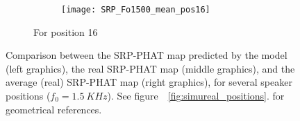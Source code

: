 \begin{figure}
\begin{subfigure}[t]{0.47\textwidth}
\begin{minipage}[t]{\textwidth}
\begin{subfigure}[t]{0.3\textwidth}
        \label{fig:SRP_pos16}
      \end{subfigure}
      \begin{subfigure}[t]{0.3\textwidth}
        \texttt{[image: SRP\_Fo1500\_mean\_pos16]}
        \label{fig:SRP_Fo1500_mean_pos16}
      \end{subfigure}
      \vspace{\verticalSpacingSRPMaps}
      \caption{\centering For position 16}
      \vspace{0.25cm}
    \end{minipage}
  \end{subfigure}
  \caption{Comparison between the SRP-PHAT map predicted by the model
    (left graphics),
    the real SRP-PHAT map (middle graphics), and the average (real)
    SRP-PHAT map (right graphics), for
    several speaker positions ($f_0=1.5~KHz$). See
    figure~~\ref{fig:simureal_positions}.
    for geometrical references.}
  \label{fig:SRPvsPatternSelected}
\end{figure}
